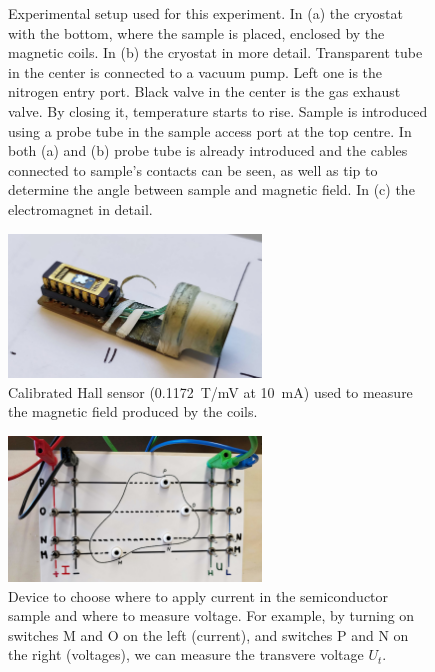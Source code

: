 \documentclass[11pt,a4paper]{article}
\begin{document}
\begin{figure}[H]
\begin{subfigure}[b]{0.6\textwidth}
\caption{}
\label{fig:electromagnet}
\end{subfigure}
\caption{Experimental setup used for this experiment. In (a) the cryostat with the bottom, where the sample is placed, enclosed by the magnetic coils. In (b) the cryostat in more detail. Transparent tube in the center is connected to a vacuum pump. Left one is the nitrogen entry port. Black valve in the center is the gas exhaust valve. By closing it, temperature starts to rise. Sample is introduced using a probe tube in the sample access port at the top centre. In both (a) and (b) probe tube is already introduced and the cables connected to sample's contacts can be seen, as well as tip to determine the angle between sample and magnetic field. In (c) the electromagnet in detail.}
\label{fig:experimental_setup_all}
\end{figure}

\begin{figure}[H]
\centering
\includegraphics[width=0.6\textwidth]{Hall_sensor}
\caption{Calibrated Hall sensor (\SI{0.1172}{\tesla/\milli\volt} at \SI{10}{\milli\ampere}) used to measure the magnetic field produced by the coils.}
\label{fig:Hall_sensor}
\end{figure}

\begin{figure}[H]
\centering
\includegraphics[width=0.6\textwidth]{Experimental_setup_cables}
\caption{Device to choose where to apply current in the semiconductor sample and where to measure voltage. For example, by turning on switches M and O on the left (current), and switches P and N on the right (voltages), we can measure the transvere voltage $U_t$.}
\label{fig:cables}
\end{figure}
\end{document}

